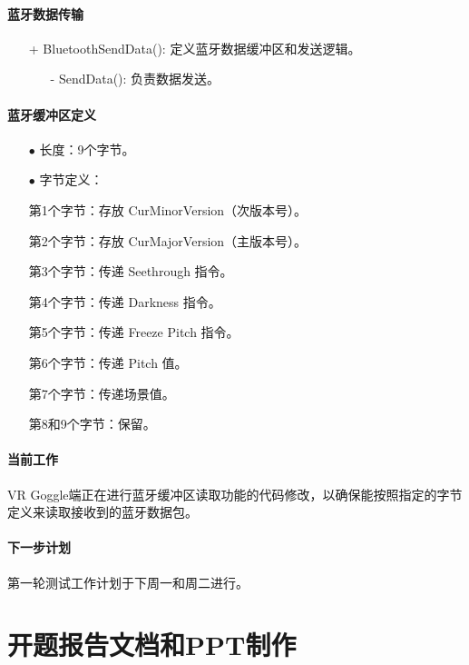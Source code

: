 \documentclass[a4paper, 10pt]{article}
\begin{document}
	\subsection{蓝牙数据传输}
	
	\begin{itemize}
		\item [+] BluetoothSendData(): 定义蓝牙数据缓冲区和发送逻辑。
			\begin{itemize}
				\item [-] SendData(): 负责数据发送。
			\end{itemize}
	\end{itemize}
	
	\subsection{蓝牙缓冲区定义}
	
	\begin{itemize}
		\item [$\bullet$] 长度：9个字节。
		\item [$\bullet$] 字节定义：
			
			第1个字节：存放 CurMinorVersion（次版本号）。
			
			第2个字节：存放 CurMajorVersion（主版本号）。
			
			第3个字节：传递 Seethrough 指令。
			
			第4个字节：传递 Darkness 指令。
			
			第5个字节：传递 Freeze Pitch 指令。
			
			第6个字节：传递 Pitch 值。
			
			第7个字节：传递场景值。
			
			第8和9个字节：保留。
	\end{itemize}
	
	\subsection{当前工作}
	
	VR Goggle端正在进行蓝牙缓冲区读取功能的代码修改，以确保能按照指定的字节定义来读取接收到的蓝牙数据包。
	
	\subsection{下一步计划}
	
	第一轮测试工作计划于下周一和周二进行。
	
	\part*{ 开题报告文档和PPT制作}
	
\end{document}

